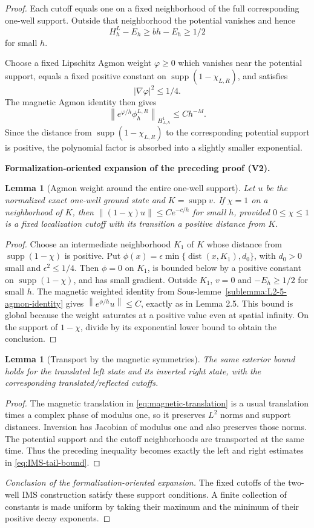 \documentclass[11pt]{article}
\newtheorem{lemma}[theorem]{Lemma}
\newcommand{\formalisationparentid}{X}
\newenvironment{formalisationaddition}[1]{\par\medskip\begingroup\color{blue}\def\formalisationparentid{#1}\setcounter{formalizationsublemma}{0}\let\lemma\formalizationsublemma\let\endlemma\endformalizationsublemma
  \def\Eo{\mathcal E_h^\circ}\def\EE{\mathcal E_h}\def\phio{\phi_h^\circ}\def\phih{\phi_h}\def\Ho{H_h^{\rm atom}(v^\circ)}\def\Ha{H_h^{\rm atom}}\def\HL{H_h^{L}}\def\Dh{D_h}\def\Log{\operatorname{Log}}\def\ellh{\ell_h}\def\Gp{G_{p,h}}\def\Ast{A_{*,h}}\def\ahat{\widehat{\mathfrak a}_h}\def\ah{\mathfrak a_h}\def\rh{\widehat\rho_h}\def\deltah{\widehat\delta_h}\def\oldref##1{\textup{(##1)}}\def\interface##1{\par\noindent\textit{Analytical interface used here.} ##1\par}\def\finish{\par\noindent\textit{Conclusion of the formalization-oriented expansion.} }\par\noindent\textbf{Formalization-oriented expansion of the preceding proof (V2).}\par\smallskip
}{\par\endgroup\medskip
}
\newcommand{\norm}[1]{\left\|#1\right\|}
\newcommand{\supp}{\operatorname{supp}}
\newcommand{\dist}{\operatorname{dist}}
\begin{document}
\begin{proof}
Each cutoff equals one on a fixed neighborhood of the full corresponding one-well
support.  Outside that neighborhood the potential vanishes and hence
\[
H_h^L-E_h\ge bh-E_h\ge1/2
\]
for small $h$.  

Choose a fixed Lipschitz
Agmon weight $\varphi\ge0$ which vanishes near the potential support, equals
a fixed positive constant on $\supp(1-\chi_{L,R})$, and satisfies
\[
|\nabla\varphi|^2\le1/4.  
\]
The magnetic Agmon identity then gives
\[
 \norm{e^{\varphi/h}\phi_h^{L,R}}_{H^1_{A,h}}
 \le Ch^{-M}.
\]
Since the distance from $\supp(1-\chi_{L,R})$ to the corresponding potential support
is positive, the polynomial factor is absorbed into a slightly smaller exponential.

\begin{formalisationaddition}{L4.1}
\begin{lemma}[Agmon weight around the entire one-well support]\label{sublemma:L4-1-global-tail}
Let $u$ be the normalized exact one-well ground state and $K=\supp v$. If $\chi=1$ on a neighborhood of $K$, then
$\norm{(1-\chi)u}\le Ce^{-c/h}$ for small $h$, provided $0\le\chi\le1$ is a fixed localization cutoff with its transition a positive distance from $K$.
\end{lemma}
\begin{proof}
Choose an intermediate neighborhood $K_1$ of $K$ whose distance from $\supp(1-\chi)$ is positive. Put $\phi(x)=\epsilon\min\{\dist(x,K_1),d_0\}$, with $d_0>0$ small and $\epsilon^2\le1/4$. Then $\phi=0$ on $K_1$, is bounded below by a positive constant on $\supp(1-\chi)$, and has small gradient. Outside $K_1$, $v=0$ and $-E_h\ge1/2$ for small $h$. The magnetic weighted identity from Sous-lemme~\ref{sublemma:L2-5-agmon-identity} gives $\norm{e^{\phi/h}u}\le C$, exactly as in Lemma 2.5. This bound is global because the weight saturates at a positive value even at spatial infinity. On the support of $1-\chi$, divide by its exponential lower bound to obtain the conclusion.
\end{proof}

\begin{lemma}[Transport by the magnetic symmetries]\label{sublemma:L4-1-transport}
The same exterior bound holds for the translated left state and its inverted right state, with the corresponding translated/reflected cutoffs.
\end{lemma}
\begin{proof}
The magnetic translation in \eqref{eq:magnetic-translation} is a usual translation times a complex phase of modulus one, so it preserves $L^2$ norms and support distances. Inversion has Jacobian of modulus one and also preserves those norms. The potential support and the cutoff neighborhoods are transported at the same time. Thus the preceding inequality becomes exactly the left and right estimates in \eqref{eq:IMS-tail-bound}.
\end{proof}
\finish The fixed cutoffs of the two-well IMS construction satisfy these support conditions. A finite collection of constants is made uniform by taking their maximum and the minimum of their positive decay exponents.
\end{formalisationaddition}


\end{proof}
\end{document}
